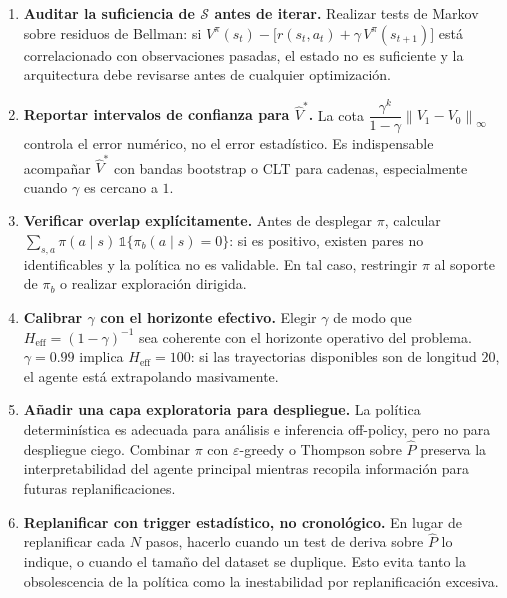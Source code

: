 \documentclass[12pt, a4paper]{article}
\theoremstyle{plain}
\theoremstyle{definition}
\newcommand{\cS}{\mathcal{S}}
\newcommand{\Vpi}{V^{\pi}}
\newcommand{\norminf}[1]{\left\|#1\right\|_{\infty}}
\newcommand{\pibeh}{\pi_b}
\newcommand{\Phat}{\widehat{P}}
\begin{document}
\begin{enumerate}[label=\textbf{R\arabic*.}, leftmargin=2.5em, noitemsep]
  \item \textbf{Auditar la suficiencia de $\cS$ antes de iterar.}
        Realizar tests de Markov sobre residuos de Bellman: si
        $\Vpi(s_t)-\bigl[r(s_t,a_t)+\gamma\,\Vpi(s_{t+1})\bigr]$ está
        correlacionado con observaciones pasadas, el estado no es
        suficiente y la arquitectura debe revisarse antes de cualquier
        optimización.

  \item \textbf{Reportar intervalos de confianza para $\widehat{V}^{*}$.}
        La cota $\dfrac{\gamma^k}{1-\gamma}\norminf{V_1-V_0}$ controla el
        error numérico, no el error estadístico. Es indispensable
        acompañar $\widehat{V}^{*}$ con bandas bootstrap o CLT para
        cadenas, especialmente cuando $\gamma$ es cercano a $1$.

  \item \textbf{Verificar overlap explícitamente.}
        Antes de desplegar $\pi$, calcular
        $\sum_{s,a}\pi(a\mid s)\,\mathbb{1}\{\pibeh(a\mid s)=0\}$: si es
        positivo, existen pares no identificables y la política no es
        validable. En tal caso, restringir $\pi$ al soporte de $\pibeh$ o
        realizar exploración dirigida.

  \item \textbf{Calibrar $\gamma$ con el horizonte efectivo.}
        Elegir $\gamma$ de modo que
        $H_{\mathrm{eff}}=(1-\gamma)^{-1}$ sea coherente con el horizonte
        operativo del problema. $\gamma=0.99$ implica $H_{\mathrm{eff}}=100$:
        si las trayectorias disponibles son de longitud $20$, el agente
        está extrapolando masivamente.

  \item \textbf{Añadir una capa exploratoria para despliegue.}
        La política determinística es adecuada para análisis e inferencia
        off-policy, pero no para despliegue ciego. Combinar $\pi$ con
        $\varepsilon$-greedy o Thompson sobre $\Phat$ preserva la
        interpretabilidad del agente principal mientras recopila
        información para futuras replanificaciones.

  \item \textbf{Replanificar con trigger estadístico, no cronológico.}
        En lugar de replanificar cada $N$ pasos, hacerlo cuando un test
        de deriva sobre $\Phat$ lo indique, o cuando el tamaño del
        dataset se duplique. Esto evita tanto la obsolescencia de la
        política como la inestabilidad por replanificación excesiva.
\end{enumerate}
\end{document}

